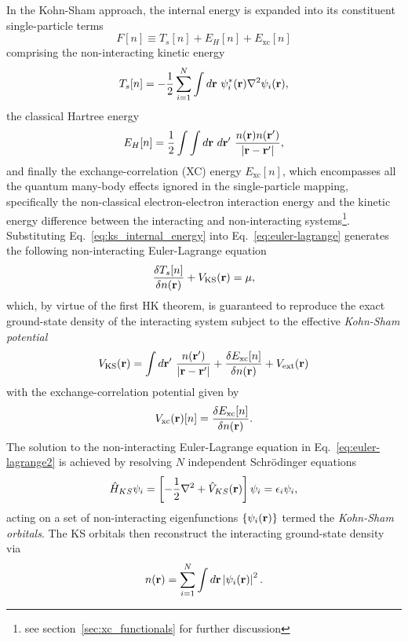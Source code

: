 In the Kohn-Sham approach, 
the internal energy is expanded 
into its constituent single-particle terms  
%
\begin{equation}
F[n]\equiv T_s[n]+E_H[n]+E_\textrm{xc}[n]
\label{eq:ks_internal_energy}
\end{equation}
%
comprising the {non-interacting} 
kinetic energy %
%
\begin{equation}
T_s[n]=-\frac{1}{2}\sum^{N}_{i=1}\int d\br\ \psi^*_i(\br)\nabla^2 \psi_i(\br),
\end{equation}
%
the classical Hartree energy %
%
\begin{equation}
E_H[n]=\frac{1}{2}\int\int d\br\ d{\bf r'}\ \frac{n(\br)n({\bf r'})}{|{ \bf r-r'}|},
\label{eq:classical_hartree_energy}
\end{equation}
%
and finally the exchange-correlation (XC) energy $E_\textrm{xc}[n]$, 
which encompasses all the quantum many-body effects 
ignored in the single-particle mapping, 
specifically the non-classical electron-electron interaction energy 
and the kinetic energy difference between the 
interacting and non-interacting systems\footnote{
see section~\ref{sec:xc_functionals} for further discussion}.
%
Substituting Eq.~\eqref{eq:ks_internal_energy} 
into Eq.~\eqref{eq:euler-lagrange} 
generates the following 
non-interacting Euler-Lagrange equation 
%
\begin{equation}
\frac{\delta T_s[n]}{\delta n({\bf r})}+V_\textrm{KS}({\bf r})=\mu, 
\label{eq:euler-lagrange2}
\end{equation} 
%
which, by virtue of the first HK theorem, 
is guaranteed to reproduce 
the exact ground-state density 
of the interacting system 
subject to the effective 
\emph{Kohn-Sham potential} 
%
\begin{equation}
V_\textrm{KS}({\bf r})=
\int d{\bf r}'\ \frac{n({\bf r}')}{|{\bf r}-{\bf r}'|}
+\frac{\delta E_\textrm{xc}[n]}{\delta n({\bf r})}
+V_\textrm{ext}({\bf r})
\label{eq:ks_schroding_equation}
\end{equation}
%
with the exchange-correlation potential given by
%
\begin{equation}
V_\textrm{xc}({\bf r})[n]=\frac{\delta E_\textrm{xc}[n]}{\delta n({\bf r})}.
\end{equation}
%
{
The solution to 
the non-interacting Euler-Lagrange equation in 
Eq.~\eqref{eq:euler-lagrange2} is achieved  
by resolving $N$ independent Schr\"{o}dinger equations}
%
\begin{equation}
\hat H_{KS} \psi_i=\left[-\frac{1}{2}\nabla^2+\hat{V}_{KS}({\bf r})\right]\psi_i= \epsilon_i\psi_i,
\label{eq:ks_hamiltonian}
\end{equation}
%
{acting on a set of 
non-interacting eigenfunctions $\{\psi_i({\bf r})\}$  
termed the \emph{Kohn-Sham orbitals}.}
%
{The KS orbitals then reconstruct}  
the interacting ground-state density via 
%
\begin{equation}
n({\bf r})=\sum_{i=1}^N \int d{\bf r} \left| \psi_i({\bf r})\right|^2.
\end{equation}
%


